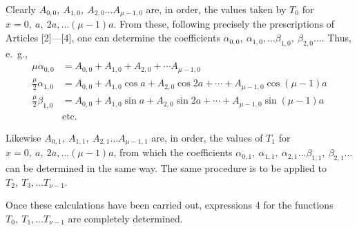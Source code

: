 \begin{landscape}
\par\noindent\hspace*{\parindent}Clearly \(A_{0,0},\ A_{1,0},\ A_{2,0}\ldots A_{\mu-1,0}\) are, in order, the values taken by \(T_0\) for \(x=0,\ a,\ 2a,\ldots(\mu-1)a\). From these, following precisely the prescriptions of Articles [2]---[4], one can determine the coefficients \(\alpha_{0,0},\ \alpha_{1,0},\ldots\beta_{1,0},\ \beta_{2,0}\ldots\). Thus, e.~g.,
\[
\begin{aligned}
\mu\alpha_{0,0}&=A_{0,0}+A_{1,0}+A_{2,0}+\cdots A_{\mu-1,0}\\[4pt]
\frac\mu2\alpha_{1,0}&=A_{0,0}+A_{1,0}\cos a+A_{2,0}\cos2a+\cdots+A_{\mu-1,0}\cos(\mu-1)a\\[4pt]
\frac\mu2\beta_{1,0}&=A_{0,0}+A_{1,0}\sin a+A_{2,0}\sin2a+\cdots+A_{\mu-1,0}\sin(\mu-1)a\\
 &\text{etc.}
\end{aligned}
\]

\par\noindent\hspace*{\parindent}Likewise \(A_{0,1},\ A_{1,1},\ A_{2,1}\ldots A_{\mu-1,1}\) are, in order, the values of \(T_1\) for \(x=0,\ a,\ 2a,\ldots(\mu-1)a\), from which the coefficients \(\alpha_{0,1},\ \alpha_{1,1},\ \alpha_{2,1}\ldots\beta_{1,1},\ \beta_{2,1}\ldots\) can be determined in the same way. The same procedure is to be applied to \(T_2,\ T_3,\ldots T_{\nu-1}\).

\par\noindent\hspace*{\parindent}Once these calculations have been carried out, expressions 4 for the functions \(T_0,\ T_1,\ldots T_{\nu-1}\) are completely determined.


\end{landscape}
